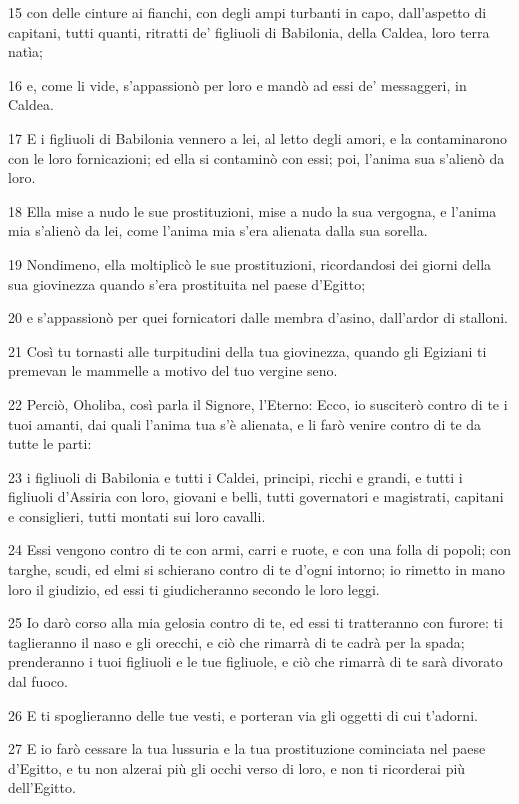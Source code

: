 \par 15 con delle cinture ai fianchi, con degli ampi turbanti in capo, dall'aspetto di capitani, tutti quanti, ritratti de' figliuoli di Babilonia, della Caldea, loro terra natìa;
\par 16 e, come li vide, s'appassionò per loro e mandò ad essi de' messaggeri, in Caldea.
\par 17 E i figliuoli di Babilonia vennero a lei, al letto degli amori, e la contaminarono con le loro fornicazioni; ed ella si contaminò con essi; poi, l'anima sua s'alienò da loro.
\par 18 Ella mise a nudo le sue prostituzioni, mise a nudo la sua vergogna, e l'anima mia s'alienò da lei, come l'anima mia s'era alienata dalla sua sorella.
\par 19 Nondimeno, ella moltiplicò le sue prostituzioni, ricordandosi dei giorni della sua giovinezza quando s'era prostituita nel paese d'Egitto;
\par 20 e s'appassionò per quei fornicatori dalle membra d'asino, dall'ardor di stalloni.
\par 21 Così tu tornasti alle turpitudini della tua giovinezza, quando gli Egiziani ti premevan le mammelle a motivo del tuo vergine seno.
\par 22 Perciò, Oholiba, così parla il Signore, l'Eterno: Ecco, io susciterò contro di te i tuoi amanti, dai quali l'anima tua s'è alienata, e li farò venire contro di te da tutte le parti:
\par 23 i figliuoli di Babilonia e tutti i Caldei, principi, ricchi e grandi, e tutti i figliuoli d'Assiria con loro, giovani e belli, tutti governatori e magistrati, capitani e consiglieri, tutti montati sui loro cavalli.
\par 24 Essi vengono contro di te con armi, carri e ruote, e con una folla di popoli; con targhe, scudi, ed elmi si schierano contro di te d'ogni intorno; io rimetto in mano loro il giudizio, ed essi ti giudicheranno secondo le loro leggi.
\par 25 Io darò corso alla mia gelosia contro di te, ed essi ti tratteranno con furore: ti taglieranno il naso e gli orecchi, e ciò che rimarrà di te cadrà per la spada; prenderanno i tuoi figliuoli e le tue figliuole, e ciò che rimarrà di te sarà divorato dal fuoco.
\par 26 E ti spoglieranno delle tue vesti, e porteran via gli oggetti di cui t'adorni.
\par 27 E io farò cessare la tua lussuria e la tua prostituzione cominciata nel paese d'Egitto, e tu non alzerai più gli occhi verso di loro, e non ti ricorderai più dell'Egitto.
